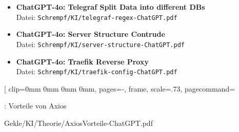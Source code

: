 \documentclass[
    headings=optiontotocandhead,%
    twoside,
    numbers=noenddot,%
    12pt, %
    titlepage, %
    parskip=full, %
    listof=leveldown, 
    numbers=noenddot, %
    a4paper,DIV=14,
    BCOR=15mm,
]{scrbook}
\begin{document}
\begin{itemize}
{Database}\\  Datei: \texttt{Schrempf/KI/schiff-db-creation-ChatGPT.pdf}
\item \textbf{ChatGPT-4o: Telegraf Split Data into different
DBs}\\  Datei: \texttt{Schrempf/KI/telegraf-regex-ChatGPT.pdf}
\item \textbf{ChatGPT-4o: Server Structure
Contrude}\\  Datei: \texttt{Schrempf/KI/server-structure-ChatGPT.pdf}
\item \textbf{ChatGPT-4o: Traefik Reverse
Proxy}\\  Datei: \texttt{Schrempf/KI/traefik-config-ChatGPT.pdf}
\end{itemize}


{}

%
{}

%
{}
[
    clip=0mm 0mm 0mm 0mm,
    pages=-,
    frame,
    scale=.73,
    pagecommand={\begin{center}: Vorteile von
Axios\\\begin{tiny}Gekle/KI/Theorie/AxiosVorteile-ChatGPT.pdf\end{tiny}\end{center}}
\end{document}
